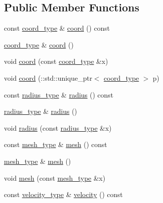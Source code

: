 \subsection*{Public Member Functions}
\begin{DoxyCompactItemize}
\item 
const \hyperlink{classsphere__t_a60b541b054e6695017e6468b51a89efd}{coord\+\_\+type} \& \hyperlink{classsphere__t_a65dc1c69a9ce993e05abcd2f4eb82ce7}{coord} () const 
\item 
\hyperlink{classsphere__t_a60b541b054e6695017e6468b51a89efd}{coord\+\_\+type} \& \hyperlink{classsphere__t_a061a16a1b44b64476f6c309b3d7c0c8c}{coord} ()
\item 
void \hyperlink{classsphere__t_a2b1201c86dfcf6db3ed736bca0311f8c}{coord} (const \hyperlink{classsphere__t_a60b541b054e6695017e6468b51a89efd}{coord\+\_\+type} \&x)
\item 
void \hyperlink{classsphere__t_a67daadc45c693216e09d4fc71cd93181}{coord} (\+::std\+::unique\+\_\+ptr$<$ \hyperlink{classsphere__t_a60b541b054e6695017e6468b51a89efd}{coord\+\_\+type} $>$ p)
\item 
const \hyperlink{classsphere__t_a7d5046bdba409d8f49e7c9902ae56278}{radius\+\_\+type} \& \hyperlink{classsphere__t_a03642128bebc2b8a591e7f29d1d18c13}{radius} () const 
\item 
\hyperlink{classsphere__t_a7d5046bdba409d8f49e7c9902ae56278}{radius\+\_\+type} \& \hyperlink{classsphere__t_a81e6298c6de20edbdd3f8ea438034a44}{radius} ()
\item 
void \hyperlink{classsphere__t_a60f5b0da9c0d08cd75cb6871caa0a405}{radius} (const \hyperlink{classsphere__t_a7d5046bdba409d8f49e7c9902ae56278}{radius\+\_\+type} \&x)
\item 
const \hyperlink{classsphere__t_af7cb7f854954b484b72bbed0516e223a}{mesh\+\_\+type} \& \hyperlink{classsphere__t_a1ea6a2dbe233f32d1a68fa33c12d3b1c}{mesh} () const 
\item 
\hyperlink{classsphere__t_af7cb7f854954b484b72bbed0516e223a}{mesh\+\_\+type} \& \hyperlink{classsphere__t_a146469480973620594053f38f6f88669}{mesh} ()
\item 
void \hyperlink{classsphere__t_aa0acd0f1e79672d00cba7a54e6d2429f}{mesh} (const \hyperlink{classsphere__t_af7cb7f854954b484b72bbed0516e223a}{mesh\+\_\+type} \&x)
\item 
const \hyperlink{classsphere__t_ad38aced876188b1732a5c050670f8cff}{velocity\+\_\+type} \& \hyperlink{classsphere__t_a3041c37cf16250a9237553a89411e845}{velocity} () const 
\item 

\end{DoxyCompactItemize}
